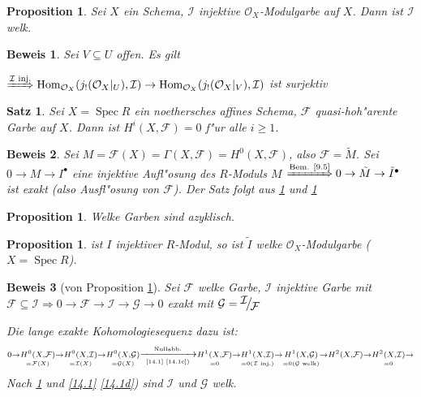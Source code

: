 \documentclass[paper = A4, fontsize=12pt, numbers=noendperiod, chapterprefix=true]{scrbook}
\theoremstyle{break}
\newtheorem{Satz}{Satz}
\newtheorem{Prop}[Def]{Proposition}
\theoremstyle{nonumberbreak}
\newtheorem{bew}{Beweis}
\theoremstyle{nonumberplain}
\DeclareMathOperator{\Hom}{Hom}
\DeclareMathOperator{\Spec}{Spec}
\newcommand{\calF}{\mathcal{F}}
\newcommand{\calG}{\mathcal{G}}
\newcommand{\calI}{\mathcal{I}}
\newcommand{\calO}{\mathcal{O}}
\newcommand{\FakRaum}[2]{
	\raisebox{0.7ex}{\ensuremath{#1}}
	\ensuremath{\mkern-3mu}\big/\ensuremath{\mkern-3mu}
	\raisebox{-0.6ex}{\ensuremath{#2}}}
\begin{document}
\begin{Prop}\label{14.2}
Sei $X$ ein Schema, $\calI$ injektive $\calO_X$-Modulgarbe auf $X$. Dann ist $\calI$ welk.
\end{Prop}

\begin{bew}
Sei $V \subseteq U$ offen. Es gilt 

$\xRightarrow{\calI \text{ inj.}} \Hom_{\calO_X}(j_!(\calO_X|_U), \calI) \to \Hom_{\calO_X}(j_!(\calO_X|_V), \calI)$ ist surjektiv
\end{bew}

\begin{Satz}
Sei $X = \Spec R$ ein noethersches affines Schema, $\calF$ quasi-hoh"arente Garbe auf $X$. Dann ist $H^i(X, \calF) = 0$ f"ur alle $i \ge 1$.
\end{Satz}

\begin{bew}
Sei $M = \calF(X) = \Gamma(X, \calF) = H^0(X, \calF)$, also $\calF = \tilde M$. Sei $0 \to M \to I^\bullet$ eine injektive Aufl"osung des $R$-Moduls $M$ $\xRightarrow{\text{Bem. \ref{9.5}}} 0 \to \tilde M \to \tilde I^\bullet$ ist exakt (also Ausfl"osung von $\calF$). Der Satz folgt aus \ref{14.4} und \ref{14.3}
\end{bew}

\begin{Prop}\label{14.3}
Welke Garben sind azyklisch.
\end{Prop}

\begin{Prop}\label{14.4}
ist $I$ injektiver $R$-Modul, so ist $\tilde I$ welke $\calO_X$-Modulgarbe ($X = \Spec R$).
\end{Prop}

\begin{bew}[von Proposition \ref{14.3}]
Sei $\calF$ welke Garbe, $\calI$ injektive Garbe mit $\calF \subseteq \calI \Rightarrow 0 \to \calF \to \calI \to \calG \to 0$ exakt mit $\calG = \FakRaum{\calI}{\calF}$

Die lange exakte Kohomologiesequenz dazu ist:
	\[\scriptstyle{ 0 \to \underset{=\calF(X)}{H^0(X, \calF)} \to \underset{=\calI(X)}{H^0(X, \calI)} \to \underset{=\calG(X)}{H^0(X, \calG)} \xrightarrow[\text{\ref{14.1} \ref{14.1c})}]{\text{Nullabb.}} \underset{=0}{H^1(X, \calF)} \to \underset{=0 (\calI\text{ inj.})}{H^1(X, \calI)} \to \underset{=0 (\calG\text{ welk})}{H^1(X, \calG)} \to H^2(X, \calF) \to \underset{=0}{H^2(X, \calI)} \to }\]
Nach \ref{14.2} und \ref{14.1} \ref{14.1d}) sind $\calI$ und $\calG$ welk.
\end{bew}
\end{document}
